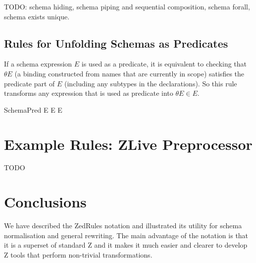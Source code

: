 \documentclass{entcs}
\newcommand{\sexprUnfoldsTo}{\mathrel{=_{se}}}
\newcommand{\schemaEquals}{\mathrel{=_S}}
\begin{document}
TODO: schema hiding, schema piping and sequential composition,
schema forall, schema exists unique.


%


\subsection{Rules for Unfolding Schemas as Predicates}

If a schema expression $E$ is used as a predicate, it is equivalent to
checking that $\theta E$ (a binding constructed from names that are
currently in scope) satisfies the predicate part of $E$ 
(including any subtypes in the declarations).  So this rule
transforms any expression that is used as predicate into $\theta E \in E$.
\begin{zedrule}{SchemaPred}
  E \iff \theta E \in E
\end{zedrule}


\section{Example Rules: ZLive Preprocessor} \label{sec:zlive}

TODO

\section{Conclusions} \label{sec:concl}

We have described the ZedRules notation and illustrated its utility
for schema normalisation and general rewriting.  The main advantage
of the notation is that it is a superset of standard Z and it makes it
much easier and clearer to develop Z tools that perform non-trivial
transformations.
\end{document}
